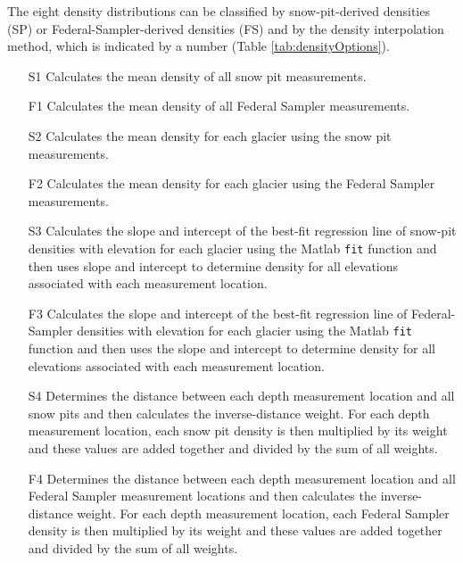 \documentclass{sfuthesis}
\begin{document}
The eight density distributions can be classified by snow-pit-derived densities (SP) or Federal-Sampler-derived densities (FS) and by the density interpolation method, which is indicated by a number (Table \ref{tab:densityOptions}).
\begin{itemize}
	\item[S1] Calculates the mean density of all snow pit measurements.
	\item[F1] Calculates the mean density of all Federal Sampler measurements.
	\item[S2] Calculates the mean density for each glacier using the snow pit measurements. 
	\item[F2] Calculates the mean density for each glacier using the Federal Sampler measurements. 
	\item[S3] Calculates the slope and intercept of the best-fit regression line of snow-pit densities with elevation for each glacier using the Matlab \texttt{fit} function and then uses slope and intercept to determine density for all elevations associated with each measurement location.
	\item[F3] Calculates the slope and intercept of the best-fit regression line of Federal-Sampler densities with elevation for each glacier using the Matlab \texttt{fit} function and then uses the slope and intercept to determine density for all elevations associated with each measurement location.
	\item[S4] Determines the distance between each depth measurement location and all snow pits and then calculates the inverse-distance weight. For each depth measurement location, each snow pit density is then multiplied by its weight and these values are added together and divided by the sum of all weights. 
	\item[F4] Determines the distance between each depth measurement location and all Federal Sampler measurement locations and then calculates the inverse-distance weight. For each depth measurement location, each Federal Sampler density is then multiplied by its weight and these values are added together and divided by the sum of all weights. 
	\end{itemize}
\end{document}
